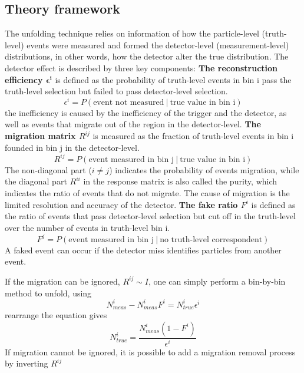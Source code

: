 \documentclass[12pt]{article}
\begin{document}
        \subsection{Theory framework}
            \par The unfolding technique relies on information of how the particle-level (truth-level) events were measured and 
            formed the detector-level (measurement-level) distributions, in other words, how the detector alter the true distribution. 
            The detector effect is described by three key components:\newline
            \textbf{The reconstruction efficiency $\mathbf{\epsilon{^{i}}}$} is defined as the probability of truth-level events in bin i pass the truth-level 
            selection but failed to pass detector-level selection.
            $$\epsilon^{i} = P(\text{event not measured}\ |\ \text{true value in bin i})$$
            the inefficiency is caused by the inefficiency of the trigger and the detector, as well as events that migrate out of the 
            region in the detector-level.\newline
            \textbf{The migration matrix $R^{ij}$} is measured as the fraction of truth-level events in bin i founded in bin j in the detector-level.
            $$R^{ij} = P(\text{event measured in bin j}\ |\ \text{true value in bin i})$$
            The non-diagonal part ($i\neq j$) indicates the probability of events migration, while the diagonal part $R^{ii}$ in the response matrix is also called the purity, 
            which indicates the ratio of events that do not migrate. The cause of migration is the limited resolution and accuracy of the detector.\newline
            \textbf{The fake ratio $F^i$} is defined as the ratio of events that pass detector-level selection but cut off in the truth-level over the number of events in truth-level bin i.
            $$F^j = P( \text{event measured in bin j}\ |\ \text{no truth-level correspondent})$$
            A faked event can occur if the detector miss identifies particles from another event.
            \par If the migration can be ignored, $R^{ij} \sim I$, one can simply perform a bin-by-bin method to unfold, using
            $$N_{meas}^i -  N_{meas}^i F^{i} = N_{true}^i {\epsilon^{i}}$$
            rearrange the equation gives
            $$N_{true}^i = \frac{N_{meas}^i(1-F^i)}{{\epsilon^{i}}}$$
            If migration cannot be ignored, it is possible to add a migration removal process by inverting $R^{ij}$
\end{document}
